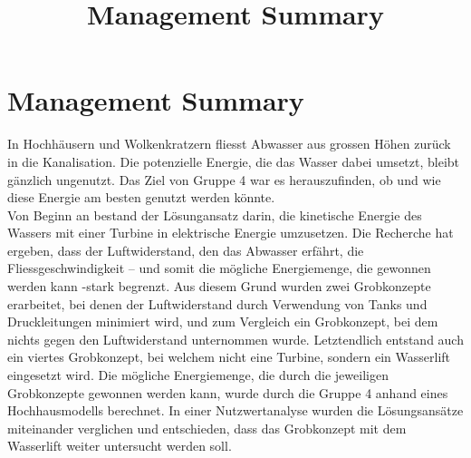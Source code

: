 \documentclass[12pt]{article}
\title{Management Summary}
\begin{document}
\section*{Management Summary}
In Hochhäusern und Wolkenkratzern fliesst Abwasser aus grossen Höhen zurück in die Kanalisation. Die potenzielle Energie, die das Wasser dabei umsetzt, bleibt gänzlich ungenutzt. Das Ziel von Gruppe 4 war es herauszufinden, ob und wie diese Energie am besten genutzt werden könnte. \\


Von Beginn an bestand der Lösungansatz darin, die kinetische Energie des Wassers mit einer Turbine in elektrische Energie umzusetzen. Die Recherche hat ergeben, dass der Luftwiderstand, den das Abwasser erfährt, die Fliessgeschwindigkeit – und somit die mögliche Energiemenge, die gewonnen werden kann -stark begrenzt. Aus diesem Grund wurden zwei Grobkonzepte erarbeitet, bei denen der Luftwiderstand durch Verwendung von Tanks und Druckleitungen minimiert wird, und zum Vergleich ein Grobkonzept, bei dem nichts gegen den Luftwiderstand unternommen wurde. Letztendlich entstand auch ein viertes Grobkonzept, bei welchem nicht eine Turbine, sondern ein Wasserlift eingesetzt wird. Die mögliche Energiemenge, die durch die jeweiligen Grobkonzepte gewonnen werden kann, wurde durch die Gruppe 4 anhand eines Hochhausmodells berechnet. In einer Nutzwertanalyse wurden die Lösungsansätze miteinander verglichen und entschieden, dass das Grobkonzept mit dem Wasserlift weiter untersucht werden soll.\\
\end{document}
